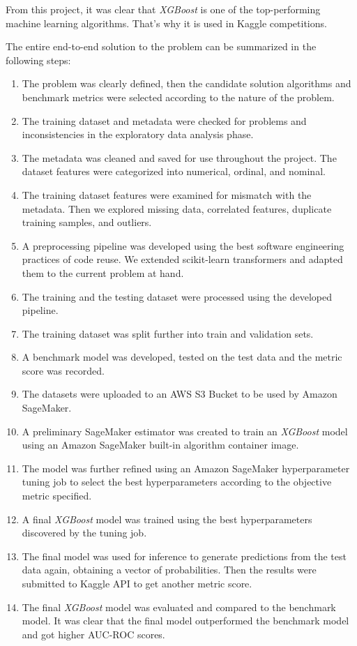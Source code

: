 \documentclass[a4paper]{article}
\begin{document}
{    From this project, it was clear that \emph{XGBoost} is one of the top-performing machine learning algorithms. That's why it is used in Kaggle competitions.
    
    The entire end-to-end solution to the problem can be summarized in the following steps:
    \begin{enumerate}
    \item The problem was clearly defined, then the candidate solution algorithms and benchmark metrics were selected according to the nature of the problem.
    \item The training dataset and metadata were checked for problems and inconsistencies in the exploratory data analysis phase.
    \item The metadata was cleaned and saved for use throughout the project. The dataset features were categorized into numerical, ordinal, and nominal.
    \item The training dataset features were examined for mismatch with the metadata. Then we explored missing data, correlated features, duplicate training samples, and outliers.
    \item A preprocessing pipeline was developed using the best software engineering practices of code reuse. We extended scikit-learn transformers and adapted them to the current problem at hand.
    \item The training and the testing dataset were processed using the developed pipeline.
    \item The training dataset was split further into train and validation sets.
    \item A benchmark model was developed, tested on the test data and the metric score was recorded.
    \item The datasets were uploaded to an AWS S3 Bucket to be used by Amazon SageMaker.
    \item A preliminary SageMaker estimator was created to train an \emph{XGBoost} model using an Amazon SageMaker built-in algorithm container image.
    \item The model was further refined using an Amazon SageMaker hyperparameter tuning job to select the best hyperparameters according to the objective metric specified.
    \item A final \emph{XGBoost} model was trained using the best hyperparameters discovered by the tuning job.
    \item The final model was used for inference to generate predictions from the test data again, obtaining a vector of probabilities. Then the results were submitted to Kaggle API to get another metric score.
    \item The final \emph{XGBoost} model was evaluated and compared to the benchmark model. It was clear that the final model outperformed the benchmark model and got higher AUC-ROC scores.
    \end{enumerate}
    
}
\end{document}
